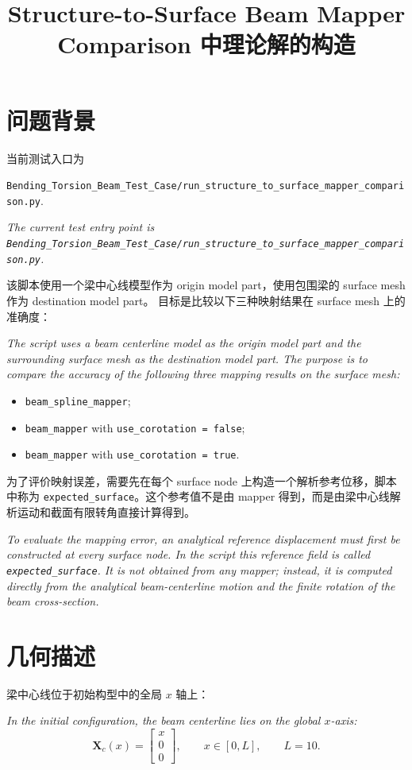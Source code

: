 \documentclass[UTF8,a4paper,11pt]{ctexart}
\title{Structure-to-Surface Beam Mapper Comparison 中理论解的构造}
\author{}
\date{}
\begin{document}
\maketitle

\section{问题背景}

当前测试入口为
\begin{center}
\texttt{Bending\_Torsion\_Beam\_Test\_Case/run\_structure\_to\_surface\_mapper\_comparison.py}.
\end{center}
\noindent\emph{The current test entry point is
\texttt{Bending\_Torsion\_Beam\_Test\_Case/run\_structure\_to\_surface\_mapper\_comparison.py}.}

该脚本使用一个梁中心线模型作为 origin model part，使用包围梁的 surface mesh 作为 destination model part。
目标是比较以下三种映射结果在 surface mesh 上的准确度：
\par\noindent\emph{The script uses a beam centerline model as the origin model part and the surrounding surface mesh as the destination model part.
The purpose is to compare the accuracy of the following three mapping results on the surface mesh:}
\begin{itemize}
  \item \texttt{beam\_spline\_mapper};
  \item \texttt{beam\_mapper} with \texttt{use\_corotation = false};
  \item \texttt{beam\_mapper} with \texttt{use\_corotation = true}.
\end{itemize}

为了评价映射误差，需要先在每个 surface node 上构造一个解析参考位移，脚本中称为
\texttt{expected\_surface}。这个参考值不是由 mapper 得到，而是由梁中心线解析运动和截面有限转角直接计算得到。
\par\noindent\emph{To evaluate the mapping error, an analytical reference displacement must first be constructed at every surface node.
In the script this reference field is called \texttt{expected\_surface}.
It is not obtained from any mapper; instead, it is computed directly from the analytical beam-centerline motion and the finite rotation of the beam cross-section.}

\section{几何描述}

梁中心线位于初始构型中的全局 \(x\) 轴上：
\par\noindent\emph{In the initial configuration, the beam centerline lies on the global \(x\)-axis:}
\begin{equation}
  \bm{X}_c(x) =
  \begin{bmatrix}
    x \\ 0 \\ 0
  \end{bmatrix},
  \qquad x \in [0,L],
  \qquad L = 10.
\end{equation}
\end{document}
